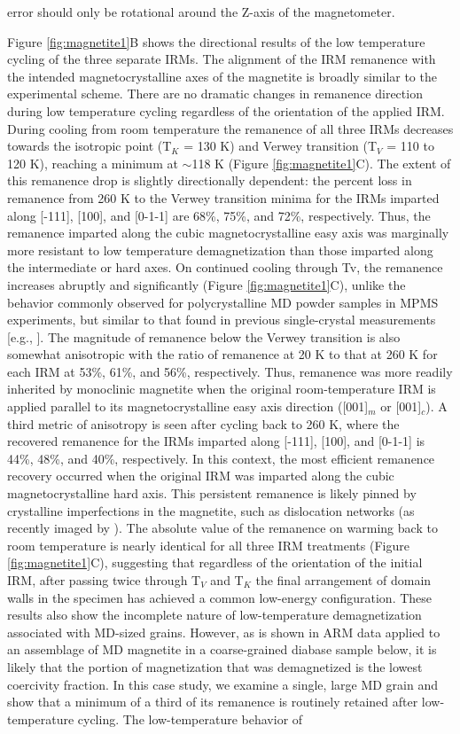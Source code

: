 \documentclass[draft,gc]{AGUTeX}
\begin{document}
\begin{article}
error should only be rotational around the Z-axis of the magnetometer.     

Figure \ref{fig:magnetite1}B shows the directional results of the low temperature cycling of the three separate IRMs. The alignment of the IRM remanence with the intended magnetocrystalline axes of the magnetite is broadly similar to the experimental scheme. There are no dramatic changes in remanence direction during low temperature cycling regardless of the orientation of the applied IRM. During cooling from room temperature the remanence of all three IRMs decreases towards the isotropic point (T$_{K}$ = 130 K) and Verwey transition (T$_{V}$ = 110 to 120 K), reaching a minimum at $\sim$118 K (Figure \ref{fig:magnetite1}C). The extent of this remanence drop is slightly directionally dependent: the percent loss in remanence from 260 K to the Verwey transition minima for the IRMs imparted along [-111], [100], and [0-1-1] are 68\%, 75\%, and 72\%, respectively. Thus, the remanence imparted along the cubic magnetocrystalline easy axis was marginally more resistant to low temperature demagnetization than those imparted along the intermediate or hard axes. On continued cooling through Tv, the remanence increases abruptly and significantly (Figure \ref{fig:magnetite1}C), unlike the behavior commonly observed for polycrystalline MD powder samples in MPMS experiments, but similar to that found in previous single-crystal measurements [e.g., \cite{Ozdemir1999a, Smirnov2011a}]. The magnitude of remanence below the Verwey transition is also somewhat anisotropic with the ratio of remanence at 20 K to that at 260 K for each IRM at 53\%, 61\%, and 56\%, respectively. Thus, remanence was more readily inherited by monoclinic magnetite when the original room-temperature IRM is applied parallel to its magnetocrystalline easy axis direction ([001]$_{m}$ or [001]$_{c}$). A third metric of anisotropy is seen after cycling back to 260 K, where the recovered remanence for the IRMs imparted along [-111], [100], and [0-1-1] is 44\%, 48\%, and 40\%, respectively. In this context, the most efficient remanence recovery occurred when the original IRM was imparted along the cubic magnetocrystalline hard axis. This persistent remanence is likely pinned by crystalline imperfections in the magnetite, such as dislocation networks (as recently imaged by \cite{Lindquist2014a}). The absolute value of the remanence on warming back to room temperature is nearly identical for all three IRM treatments (Figure \ref{fig:magnetite1}C), suggesting that regardless of the orientation of the initial IRM, after passing twice through T$_{V}$ and T$_{K}$ the final arrangement of domain walls in the specimen has achieved a common low-energy configuration. These results also show the incomplete nature of low-temperature demagnetization associated with MD-sized grains. However, as is shown in ARM data applied to an assemblage of MD magnetite in a coarse-grained diabase sample below, it is likely that the portion of magnetization that was demagnetized is the lowest coercivity fraction. In this case study, we examine a single, large MD grain and show that a minimum of a third of its remanence is routinely retained after low-temperature cycling. The low-temperature behavior of 
\end{article}
\end{document}
